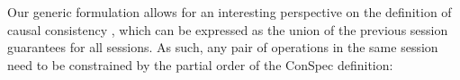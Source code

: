 \documentclass[acmlarge, ,11pt]{acmart}
\begin{document}

Our generic formulation allows for an interesting perspective on the definition of causal consistency \cite{Ahamad:1993:PPC:165231.165264}, which can be expressed as the union of the previous session guarantees for all sessions. As such, any pair of operations in the same session need to be constrained by the partial order of the ConSpec definition:
\end{document}

